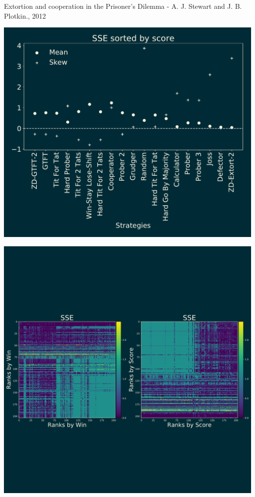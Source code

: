 \documentclass{beamer}
\begin{document}
\begin{frame}
    \begin{center}
        \vspace{1cm}

        \normalsize{Extortion and cooperation in the Prisoner's Dilemma -
        A. J. Stewart and J. B. Plotkin., 2012}

        \vspace{.5cm}
        \includegraphics[width=.7\textwidth]{static/validation_plot}
    \end{center}
\end{frame}

\begin{frame}
    \begin{center}
        \vspace{-1cm}
        \includegraphics[width=\textwidth]{static/results_sserror}
    \end{center}
\end{frame}
\end{document}

